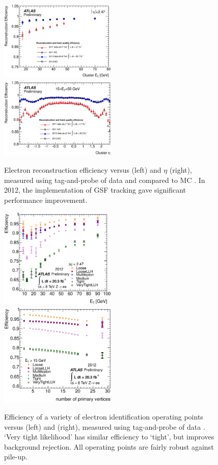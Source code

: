 \begin{figure}
	\includegraphics[width=0.495\textwidth]{tex/selection/el_recoeff_et}
	\hfill
	\includegraphics[width=0.495\textwidth]{tex/selection/el_recoeff_eta}
	\caption{Electron reconstruction efficiency versus \et (left) and $\eta$ (right), measured using tag-and-probe of \HepProcess{\PZ \HepTo \Pe\Pe} data and compared to 
	MC \cite{ElectronPerf:2012}. In 2012, the implementation of GSF tracking gave 
	significant performance improvement.}
	\label{fig:objects:el_recoeff}
\end{figure}

\begin{figure}
	\includegraphics[width=0.495\textwidth]{tex/selection/el_ideff_et}
	\hfill
	\includegraphics[width=0.495\textwidth]{tex/selection/el_ideff_npv}
	\caption{Efficiency of a variety of electron identification operating points versus 
	\et (left) and \npv (right), measured using tag-and-probe of 
	\HepProcess{\PZ \HepTo \Pe\Pe} data \cite{ElectronPerf:2012}. `Very tight likelihood' 
	has similar efficiency to `tight', but improves background rejection. All operating 
	points are fairly robust against pile-up.}
	\label{fig:objects:el_ideff}
\end{figure}

